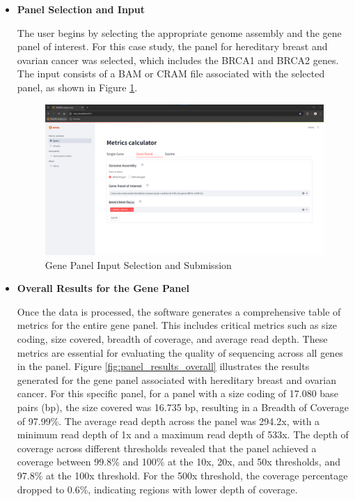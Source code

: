 \begin{itemize}
\item \textbf{Panel Selection and Input}

The user begins by selecting the appropriate genome assembly and the gene panel of interest. For this case study, the panel for hereditary breast and ovarian cancer was selected, which includes the BRCA1 and BRCA2 genes. The input consists of a BAM or CRAM file associated with the selected panel, as shown in Figure \ref{fig:panel_input}.

\begin{figure}[H]
    \centering
    \includegraphics[width=\textwidth]{figs/v3.8.png}
    \caption{Gene Panel Input Selection and Submission}
    \label{fig:panel_input}
\end{figure}

\item \textbf{Overall Results for the Gene Panel}

Once the data is processed, the software generates a comprehensive table of metrics for the entire gene panel. This includes critical metrics such as size coding, size covered, breadth of coverage, and average read depth. These metrics are essential for evaluating the quality of sequencing across all genes in the panel. Figure \ref{fig:panel_results_overall} illustrates the results generated for the gene panel associated with hereditary breast and ovarian cancer. For this specific panel, for a panel with a size coding of 17.080 base pairs (bp), the size covered was 16.735 bp, resulting in a Breadth of Coverage of 97.99\%. The average read depth across the panel was 294.2x, with a minimum read depth of 1x and a maximum read depth of 533x. The depth of coverage across different thresholds revealed that the panel achieved a coverage between 99.8\% and 100\% at the 10x, 20x, and 50x thresholds, and 97.8\% at the 100x threshold. For the 500x threshold, the coverage percentage dropped to 0.6\%, indicating regions with lower depth of coverage. 


\end{itemize}
